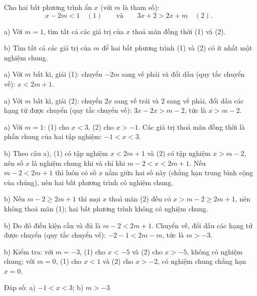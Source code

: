 \begin{problem}[9DS-BPT-028]
Cho hai bất phương trình ẩn $x$ (với $m$ là tham số):
\[ x - 2m < 1 \quad (1) \qquad \text{và} \qquad 3x + 2 > 2x + m \quad (2). \]

a) Với $m = 1$, tìm tất cả các giá trị của $x$ thoả mãn đồng thời (1) và (2).

b) Tìm tất cả các giá trị của $m$ để hai bất phương trình (1) và (2) có ít nhất một nghiệm chung.

\begin{solution}
a) Với $m$ bất kì, giải (1): chuyển $-2m$ sang vế phải và đổi dấu (quy tắc chuyển vế): $x < 2m + 1$.

a) Với $m$ bất kì, giải (2): chuyển $2x$ sang vế trái và $2$ sang vế phải, đổi dấu các hạng tử được chuyển (quy tắc chuyển vế): $3x - 2x > m - 2$, tức là $x > m - 2$.

a) Với $m = 1$: (1) cho $x < 3$, (2) cho $x > -1$. Các giá trị thoả mãn đồng thời là phần chung của hai tập nghiệm: $-1 < x < 3$.

b) Theo câu a), (1) có tập nghiệm $x < 2m + 1$ và (2) có tập nghiệm $x > m - 2$, nên số $x$ là nghiệm chung khi và chỉ khi $m - 2 < x < 2m + 1$. Nếu $m - 2 < 2m + 1$ thì luôn có số $x$ nằm giữa hai số này (chẳng hạn trung bình cộng của chúng), nên hai bất phương trình có nghiệm chung.

b) Nếu $m - 2 \geq 2m + 1$ thì mọi $x$ thoả mãn (2) đều có $x > m - 2 \geq 2m + 1$, nên không thoả mãn (1); hai bất phương trình không có nghiệm chung.

b) Do đó điều kiện cần và đủ là $m - 2 < 2m + 1$. Chuyển vế, đổi dấu các hạng tử được chuyển (quy tắc chuyển vế): $-2 - 1 < 2m - m$, tức là $m > -3$.

b) Kiểm tra: với $m = -3$, (1) cho $x < -5$ và (2) cho $x > -5$, không có nghiệm chung; với $m = 0$, (1) cho $x < 1$ và (2) cho $x > -2$, có nghiệm chung chẳng hạn $x = 0$.

Đáp số: a) $\boxed{-1 < x < 3}$; b) $\boxed{m > -3}$
\end{solution}
\end{problem}

